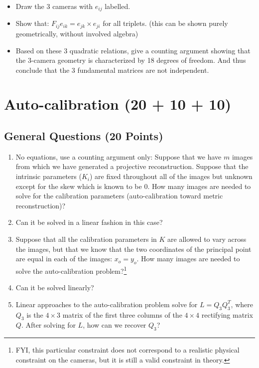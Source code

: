 \documentclass[11pt]{article}
\begin{document}
\begin{itemize}
\item Draw the 3 cameras with $e_{ij}$ labelled.
\item Show that: $F_{ij}e_{ik} = e_{jk} \times e_{ji}$ for all triplets. (this can be shown purely geometrically, without 
involved algebra)
\item Based on these 3 quadratic relations, give a counting argument showing that the 3-camera geometry is characterized by 18 degrees of freedom. And thus conclude that the $3$ fundamental matrices are not independent.
\end{itemize}

\section{Auto-calibration (20 + 10 + 10)}
\subsection{General Questions (20 Points)}
\begin{enumerate}
\item No equations, use a counting argument only: Suppose that we have
$m$ images from which we have generated a projective reconstruction.
Suppose that the intrinsic parameters ($K_i$) are fixed throughout all of
the images but unknown except for the skew which is known to be $0$.
How many images are needed to solve for the calibration parameters
(auto-calibration toward metric reconstruction)?
\item Can it be solved in a linear fashion in this case?
\item Suppose that all the calibration parameters in $K$ are allowed to vary
across the images, but that we know that the two coordinates of the
principal point are equal in each of the images: $x_o = y_o$. How many
images are needed to solve the auto-calibration problem?\footnote{FYI, this particular constraint does not correspond to a realistic physical constraint on the cameras, but it is still a valid constraint in theory.}
\item Can it be solved linearly?
\item Linear approaches to the auto-calibration problem solve for $L = Q_3Q^T_3$,
where $Q_3$ is the $4 \times 3$ matrix of the first three columns of the $4 \times 4$
rectifying matrix $Q$. After solving for $L$, how can we recover $Q_3$?
\end{enumerate}
\end{document}
